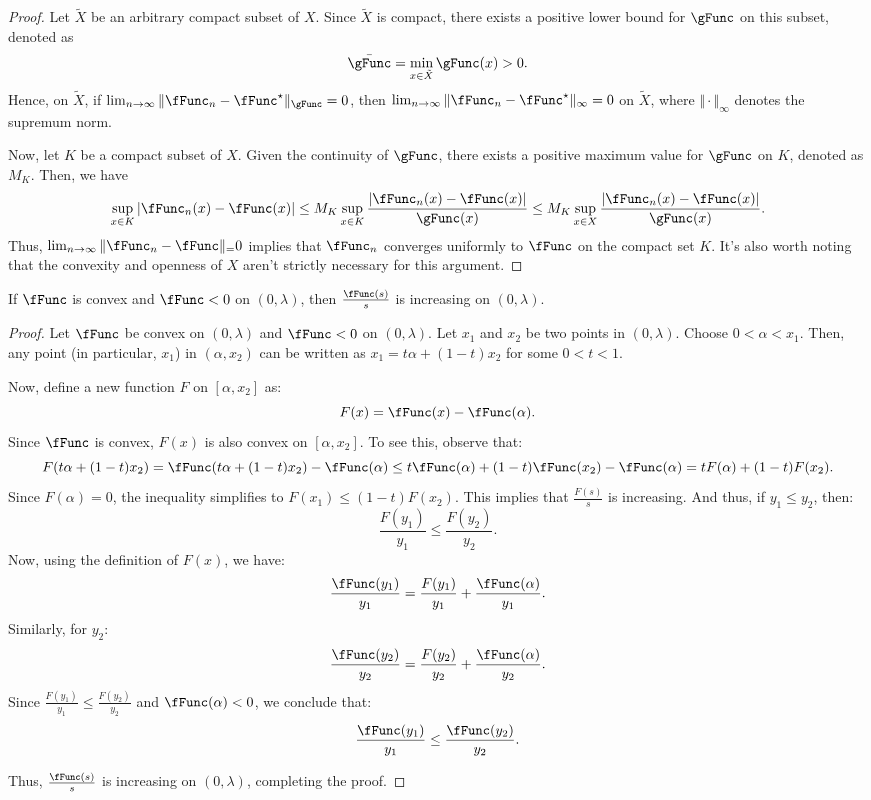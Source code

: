 \documentclass[\econtexRoot/BufferStockTheory]{subfiles}
\begin{document}
\begin{proof}
Let $\tilde{X}$ be an arbitrary compact subset of $X$.
Since $\tilde{X}$ is compact, there exists a positive lower bound for $\gFunc$ on this subset, denoted as 
\begin{equation}
\bar{\gFunc} = \min_{x \in \tilde{X}} \gFunc(x) > 0.
\end{equation}
Hence, on $\tilde{X}$, if $\lim_{n \to \infty} \Vert \fFunc_n - \fFunc^{\star} \Vert_\gFunc = 0$, then $\lim_{n \to \infty} \Vert \fFunc_n - \fFunc^{\star} \Vert_\infty = 0$ on $\tilde{X}$, where $\Vert \cdot \Vert_\infty$ denotes the supremum norm.


Now, let $K$ be a compact subset of $X$.
Given the continuity of $\gFunc$, there exists a positive maximum value for $\gFunc$ on $K$, denoted as $M_K$.
Then, we have
\begin{equation}
\sup_{x \in K} \vert \fFunc_n(x) - \fFunc(x)\vert  \leq M_K \sup_{x \in K} \frac{\vert \fFunc_n(x) - \fFunc(x)\vert }{\gFunc(x)} \leq M_K \sup_{x \in X} \frac{\vert \fFunc_n(x) - \fFunc(x)\vert }{\gFunc(x)}.
\end{equation}
Thus, $\lim_{n \to \infty} \Vert \fFunc_n - \fFunc \Vert_  = 0$ implies that $\fFunc_n$ converges uniformly to $\fFunc$ on the compact set $K$.
It's also worth noting that the convexity and openness of $X$ aren't strictly necessary for this argument.
\end{proof}


\begin{claim}\label{claim:rationondec}
If $\fFunc$ is convex and $\fFunc < 0$ on $(0, \lambda)$, then $\frac{\fFunc(s)}{s}$ is increasing on $(0, \lambda)$.
\end{claim}

\begin{proof}
Let $\fFunc$ be convex on $(0, \lambda)$ and $\fFunc < 0$ on $(0, \lambda)$.
Let $x_1$ and $x_2$ be two points in $(0, \lambda)$.
Choose $0 < \alpha < x_1$.
Then, any point (in particular, $x_1$) in $(\alpha, x_2)$ can be written as $x_1 = t \alpha + (1 - t) x_2$ for some $0 < t < 1$.

Now, define a new function $F$ on $[\alpha, x_2]$ as:
\[
F(x) = \fFunc(x) - \fFunc(\alpha).
\]
Since $\fFunc$ is convex, $F(x)$ is also convex on $[\alpha, x_2]$.
To see this, observe that:
\[
F(t\alpha + (1-t)x_2) = \fFunc(t\alpha + (1-t)x_2) - \fFunc(\alpha) \leq t \fFunc(\alpha) + (1-t) \fFunc(x_2) - \fFunc(\alpha) = t F(\alpha) + (1-t) F(x_2).
\]
Since $F(\alpha) = 0$, the inequality simplifies to $F(x_1) \leq (1-t) F(x_2)$.
This implies that $\frac{F(s)}{s}$ is increasing.
And thus, if $y_1 \leq y_2$, then:
\[
\frac{F(y_1)}{y_1} \leq \frac{F(y_2)}{y_2}.
\]
Now, using the definition of $F(x)$, we have:
\[
\frac{\fFunc(y_1)}{y_1} = \frac{F(y_1)}{y_1} + \frac{\fFunc(\alpha)}{y_1}.
\]
Similarly, for $y_2$:
\[
\frac{\fFunc(y_2)}{y_2} = \frac{F(y_2)}{y_2} + \frac{\fFunc(\alpha)}{y_2}.
\]
Since $\frac{F(y_1)}{y_1} \leq \frac{F(y_2)}{y_2}$ and $\fFunc(\alpha) < 0$, we conclude that:
\[
\frac{\fFunc(y_1)}{y_1} \leq  \frac{\fFunc(y_2)}{y_2}.
\]

Thus, $\frac{\fFunc(s)}{s}$ is increasing on $(0, \lambda)$, completing the proof.
\end{proof}
\end{document}
